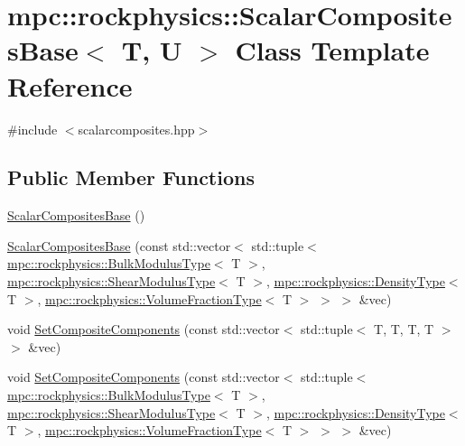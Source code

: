 \hypertarget{classmpc_1_1rockphysics_1_1_scalar_composites_base}{}\section{mpc\+:\+:rockphysics\+:\+:Scalar\+Composites\+Base$<$ T, U $>$ Class Template Reference}
\label{classmpc_1_1rockphysics_1_1_scalar_composites_base}


{\ttfamily \#include $<$scalarcomposites.\+hpp$>$}

\subsection*{Public Member Functions}
\begin{DoxyCompactItemize}
\item 
\mbox{\hyperlink{classmpc_1_1rockphysics_1_1_scalar_composites_base_ac7409da4c9a9973adb83e1e25ce15bcc}{Scalar\+Composites\+Base}} ()
\item 
\mbox{\hyperlink{classmpc_1_1rockphysics_1_1_scalar_composites_base_a17c1e34c90c9f53781b38f27cc391ad4}{Scalar\+Composites\+Base}} (const std\+::vector$<$ std\+::tuple$<$ \mbox{\hyperlink{structmpc_1_1rockphysics_1_1_bulk_modulus_type}{mpc\+::rockphysics\+::\+Bulk\+Modulus\+Type}}$<$ T $>$, \mbox{\hyperlink{structmpc_1_1rockphysics_1_1_shear_modulus_type}{mpc\+::rockphysics\+::\+Shear\+Modulus\+Type}}$<$ T $>$, \mbox{\hyperlink{structmpc_1_1rockphysics_1_1_density_type}{mpc\+::rockphysics\+::\+Density\+Type}}$<$ T $>$, \mbox{\hyperlink{structmpc_1_1rockphysics_1_1_volume_fraction_type}{mpc\+::rockphysics\+::\+Volume\+Fraction\+Type}}$<$ T $>$ $>$ $>$ \&vec)
\item 
void \mbox{\hyperlink{classmpc_1_1rockphysics_1_1_scalar_composites_base_a4087bdf26403c7b739e2807524bc5596}{Set\+Composite\+Components}} (const std\+::vector$<$ std\+::tuple$<$ T, T, T, T $>$ $>$ \&vec)
\item 
void \mbox{\hyperlink{classmpc_1_1rockphysics_1_1_scalar_composites_base_a1866cddad44ffcc54ef178eb914cad2c}{Set\+Composite\+Components}} (const std\+::vector$<$ std\+::tuple$<$ \mbox{\hyperlink{structmpc_1_1rockphysics_1_1_bulk_modulus_type}{mpc\+::rockphysics\+::\+Bulk\+Modulus\+Type}}$<$ T $>$, \mbox{\hyperlink{structmpc_1_1rockphysics_1_1_shear_modulus_type}{mpc\+::rockphysics\+::\+Shear\+Modulus\+Type}}$<$ T $>$, \mbox{\hyperlink{structmpc_1_1rockphysics_1_1_density_type}{mpc\+::rockphysics\+::\+Density\+Type}}$<$ T $>$, \mbox{\hyperlink{structmpc_1_1rockphysics_1_1_volume_fraction_type}{mpc\+::rockphysics\+::\+Volume\+Fraction\+Type}}$<$ T $>$ $>$ $>$ \&vec)

\end{DoxyCompactItemize}
